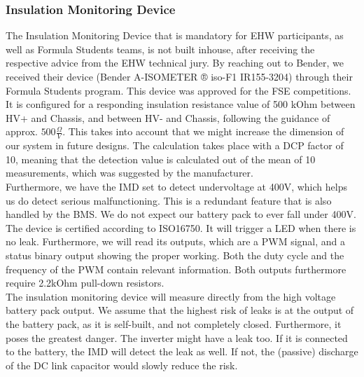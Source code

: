 \subsubsection{Insulation Monitoring Device}
The Insulation Monitoring Device that is mandatory for EHW participants, as well as Formula Students teams, is not built inhouse, after receiving the respective advice from the EHW technical jury. By reaching out to Bender, we received their device (Bender A-ISOMETER ® iso-F1 IR155-3204) through their Formula Students program. This device was approved for the FSE competitions. It is configured for a responding insulation resistance value of 500 kOhm between HV+ and Chassis, and between HV- and Chassis, following the guidance of approx. \(500 \frac{\Omega}{V}\). This takes into account that we might increase the dimension of our system in future designs. The calculation takes place with a DCP factor of 10, meaning that the detection value is calculated out of the mean of 10 measurements, which was suggested by the manufacturer.\\
Furthermore, we have the IMD set to detect undervoltage at 400V, which helps us do detect serious malfunctioning. This is a redundant feature that is also handled by the BMS. We do not expect our battery pack to ever fall under 400V. \\
The device is certified according to ISO16750. It will trigger a LED when there is no leak. Furthermore, we will read its outputs, which are a PWM signal, and a status binary output showing the proper working. Both the duty cycle and the frequency of the PWM contain relevant information. Both outputs furthermore require 2.2kOhm pull-down resistors. \\
The insulation monitoring device will measure directly from the high voltage battery pack output. We assume that the highest risk of leaks is at the output of the battery pack, as it is self-built, and not completely closed. Furthermore, it poses the greatest danger. The inverter might have a leak too. If it is connected to the battery, the IMD will detect the leak as well. If not, the (passive) discharge of the DC link capacitor would slowly reduce the risk. \\

